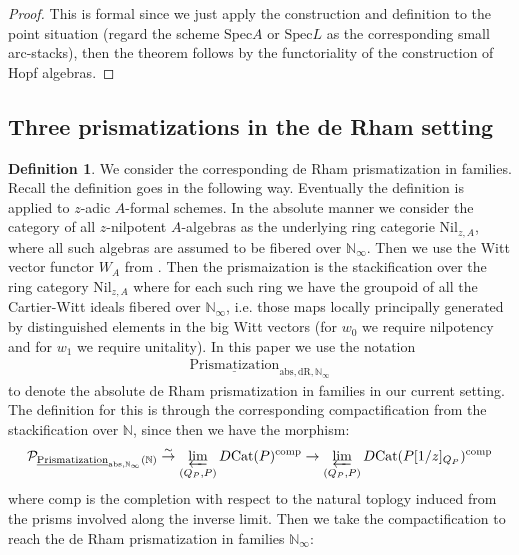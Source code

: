 \documentclass[12pt]{article}
\theoremstyle{definition}
\newtheorem{definition}{Definition}
\begin{document}
\begin{proof}
This is formal since we just apply the construction and definition to the point situation (regard the scheme $\mathrm{Spec}A$ or $\mathrm{Spec}L$ as the corresponding small arc-stacks), then the theorem follows by the functoriality of the construction of Hopf algebras.
\end{proof}



\subsection{Three prismatizations in the de Rham setting}


\begin{definition}
We consider the corresponding de Rham prismatization in families. Recall the definition goes in the following way. Eventually the definition is applied to $z$-adic $A$-formal schemes. In the absolute manner we consider the category of all $z$-nilpotent $A$-algebras as the underlying ring categorie $\mathrm{Nil}_{z,A}$, where all such algebras are assumed to be fibered over $\mathbb{N}_\infty$. Then we use the Witt vector functor $W_A$ from \cite{3LH}. Then the prismaization is the stackification over the ring category $\mathrm{Nil}_{z,A}$ where for each such ring we have the groupoid of all the Cartier-Witt ideals fibered over $\mathbb{N}_\infty$, i.e. those maps locally principally generated by distinguished elements in the big Witt vectors (for $w_0$ we require nilpotency and for $w_1$ we require unitality). In this paper we use the notation 
\begin{align}
\underline{\mathrm{Prismatization}}_{\mathrm{abs},\mathrm{dR},\mathbb{N}_\infty}
\end{align}
to denote the absolute de Rham prismatization in families in our current setting. The definition for this is through the corresponding compactification from the stackification over $\mathbb{N}$, since then we have the morphism:
\begin{align}
\mathcal{P}_{\underline{\mathrm{Prismatization}}_{\mathrm{abs},\mathbb{N}_\infty}(\mathbb{N})} \overset{\sim}{\rightarrow} \varprojlim_{(Q_P,P)} D\mathrm{Cat}(P)^\mathrm{comp}\rightarrow \varprojlim_{(Q_P,P)} D\mathrm{Cat}(P[1/z]_{Q_P})^\mathrm{comp}
\end{align}
where $\mathrm{comp}$ is the completion with respect to the natural toplogy induced from the prisms involved along the inverse limit. Then we take the compactification to reach the de Rham prismatization in families $\mathbb{N}_\infty$:

\end{definition}
\end{document}
